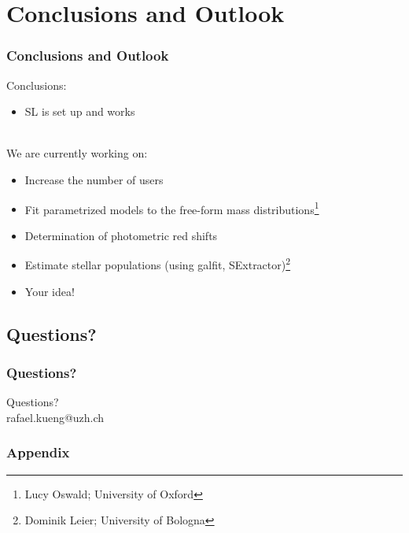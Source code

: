 \documentclass{beamer}
\begin{document}
%






\section{Conclusions and Outlook}

\begin{frame}
  \frametitle{Conclusions and Outlook}
	Conclusions:
  \begin{itemize}
		\item SL is set up and works
	\end{itemize}
	
	~\\
  
	We are currently working on:
  \begin{itemize}
		\item Increase the number of users
  	\item Fit parametrized models to the free-form mass distributions\footnote{Lucy Oswald; University of Oxford}
    \item Determination of photometric red shifts
    \item Estimate stellar populations (using galfit, SExtractor)\footnote{Dominik Leier; University of Bologna}
		\item Your idea!
  \end{itemize}
\end{frame}



\subsection*{Questions?}

\begin{frame}
  \frametitle{Questions?}
  Questions? \\
  rafael.kueng@uzh.ch
\end{frame}




\appendix

\begin{frame}
  \frametitle{Appendix}
\end{frame}
\end{document}

